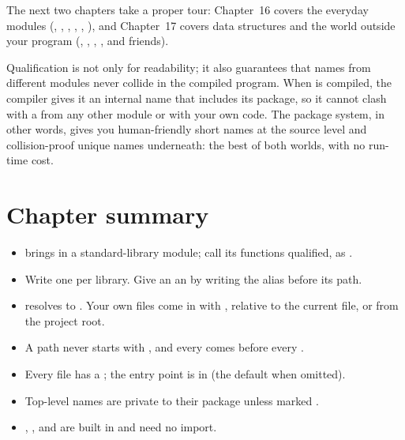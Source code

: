 The next two chapters take a proper tour: Chapter~16 covers the everyday modules
(, , , , , ), and
Chapter~17 covers data structures and the world outside your program
(, , , , and friends).

\begin{deep}
Qualification is not only for readability; it also guarantees that names from
different modules never collide in the compiled program. When  is
compiled, the compiler gives it an internal name that includes its package, so it
cannot clash with a  from any other module or with your own code. The
package system, in other words, gives you human-friendly short names at the
source level and collision-proof unique names underneath: the best of both
worlds, with no run-time cost.
\end{deep}

\section{Chapter summary}

\begin{itemize}[leftmargin=1.4em]
  \item {} brings in a standard-library module; call its
        functions qualified, as .
  \item Write one  per library. Give an  an
         by writing the alias before its path.
  \item {} resolves to . Your own
        files come in with , relative to the current
        file, or  from the project root.
  \item A path never starts with , and every  comes
        before every .
  \item Every file has a ; the entry point is in  (the
        default when omitted).
  \item Top-level names are private to their package unless marked .
  \item {}, , and  are built in and need no
        import.
\end{itemize}


